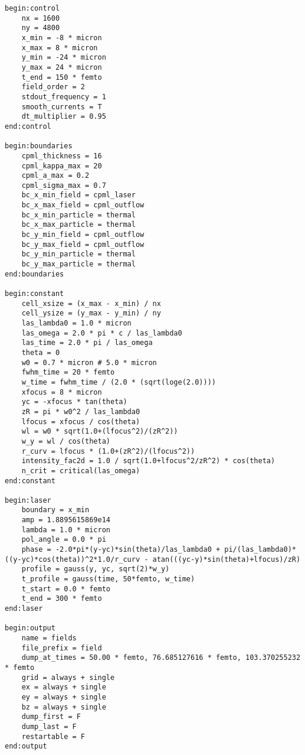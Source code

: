 \begin{lstlisting}[style=CXX, caption=test paraxial]
begin:control
	nx = 1600
	ny = 4800
	x_min = -8 * micron
	x_max = 8 * micron
	y_min = -24 * micron
	y_max = 24 * micron
	t_end = 150 * femto
	field_order = 2
	stdout_frequency = 1
	smooth_currents = T
	dt_multiplier = 0.95
end:control

begin:boundaries
	cpml_thickness = 16
	cpml_kappa_max = 20
	cpml_a_max = 0.2
	cpml_sigma_max = 0.7
	bc_x_min_field = cpml_laser
	bc_x_max_field = cpml_outflow
	bc_x_min_particle = thermal
	bc_x_max_particle = thermal
	bc_y_min_field = cpml_outflow
	bc_y_max_field = cpml_outflow
	bc_y_min_particle = thermal
	bc_y_max_particle = thermal
end:boundaries

begin:constant
	cell_xsize = (x_max - x_min) / nx
	cell_ysize = (y_max - y_min) / ny
	las_lambda0 = 1.0 * micron                            
	las_omega = 2.0 * pi * c / las_lambda0                    
	las_time = 2.0 * pi / las_omega                          
	theta = 0                                                                              
	w0 = 0.7 * micron # 5.0 * micron                                     
	fwhm_time = 20 * femto                                         
	w_time = fwhm_time / (2.0 * (sqrt(loge(2.0))))
	xfocus = 8 * micron                                         
	yc = -xfocus * tan(theta)                                      
	zR = pi * w0^2 / las_lambda0                                  
	lfocus = xfocus / cos(theta)                                   
	wl = w0 * sqrt(1.0+(lfocus^2)/(zR^2))                        
	w_y = wl / cos(theta)                                         
	r_curv = lfocus * (1.0+(zR^2)/(lfocus^2))                
	intensity_fac2d = 1.0 / sqrt(1.0+lfocus^2/zR^2) * cos(theta)   
	n_crit = critical(las_omega)                                   
end:constant

begin:laser
	boundary = x_min
	amp = 1.8895615869e14
	lambda = 1.0 * micron
	pol_angle = 0.0 * pi
	phase = -2.0*pi*(y-yc)*sin(theta)/las_lambda0 + pi/(las_lambda0)*((y-yc)*cos(theta))^2*1.0/r_curv - atan(((yc-y)*sin(theta)+lfocus)/zR)
	profile = gauss(y, yc, sqrt(2)*w_y)
	t_profile = gauss(time, 50*femto, w_time)
	t_start = 0.0 * femto
	t_end = 300 * femto
end:laser

begin:output
	name = fields
	file_prefix = field
	dump_at_times = 50.00 * femto, 76.685127616 * femto, 103.370255232 * femto
	grid = always + single
	ex = always + single
	ey = always + single
	bz = always + single
	dump_first = F
	dump_last = F
	restartable = F
end:output
\end{lstlisting}

